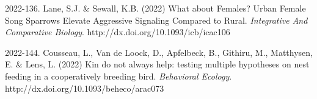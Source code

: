 2022-136. Lane, S.J. \&  Sewall, K.B. (2022) What about Females? Urban Female Song Sparrows Elevate Aggressive Signaling Compared to Rural. \textit{Integrative And Comparative Biology}. http://dx.doi.org/10.1093/icb/icac106

2022-144. Cousseau, L., Van de Loock, D., Apfelbeck, B., Githiru, M., Matthysen, E. \&  Lens, L. (2022) Kin do not always help: testing multiple hypotheses on nest feeding in a cooperatively breeding bird. \textit{Behavioral Ecology}. http://dx.doi.org/10.1093/beheco/arac073

